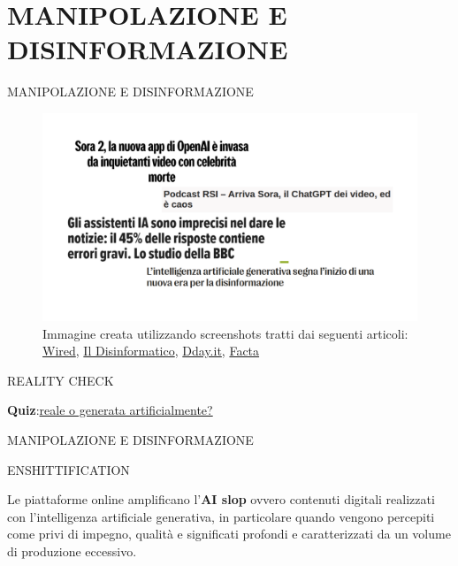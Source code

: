\documentclass[aspectratio=1610]{beamer}
\begin{document}
\section{MANIPOLAZIONE E DISINFORMAZIONE}

\begin{frame}{MANIPOLAZIONE E DISINFORMAZIONE}
    \begin{figure}
        \includegraphics[width=.7\linewidth]{img/disinformazione.png}
        \caption{
            Immagine creata utilizzando screenshots tratti dai seguenti articoli:
            \href{https://www.wired.it/article/sora-2-openai-video-celebrita-morte-michael-jackson-tupac-stephen-hawking/}{Wired},
            \href{https://attivissimo.me/2025/10/13/podcast-rsi-arriva-sora-il-chatgpt-dei-video-ed-e-caos/}{Il Disinformatico},
            \href{https://www.dday.it/redazione/55001/gli-assistenti-ia-sono-imprecisi-nel-dare-le-notizie-il-45-delle-risposte-contiene-errori-gravi-lo-studio-della-bbc}{Dday.it},
            \href{https://www.facta.news/articoli/lintelligenza-artificiale-generativa-disinformazione/}{Facta}
        }
    \end{figure}
    \begin{alertblock}{REALITY CHECK}
        \begin{minipage}{0.96\linewidth}
            \justifying
            \textbf{Quiz}:\textcolor{red}{\href{https://realitycheckk.com/}{reale o generata artificialmente?}}
        \end{minipage}
    \end{alertblock}
\end{frame}

\begin{frame}{MANIPOLAZIONE E DISINFORMAZIONE}
    \begin{alertblock}{ENSHITTIFICATION}
        \begin{minipage}{0.96\linewidth}
            \justifying
            Le piattaforme online amplificano l'\textbf{AI slop} ovvero contenuti digitali realizzati 
            con l'intelligenza artificiale generativa, in particolare quando vengono percepiti come 
            privi di impegno, qualità e significati profondi e caratterizzati da un volume di 
            produzione eccessivo.\\
            \bigskip
        \end{minipage}
    \end{alertblock}
\end{frame}
\end{document}

